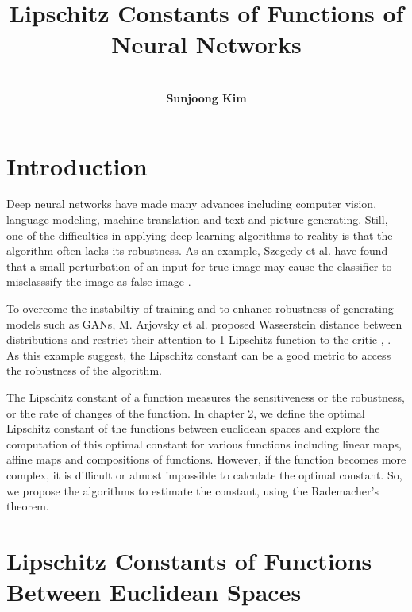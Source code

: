 \documentclass[12pt]{report}
\numberwithin{figure}{chapter}
\theoremstyle{plain}
\theoremstyle{definition}
\theoremstyle{corollary}
\theoremstyle{definition}
\theoremstyle{plain}
\theoremstyle{definition}
\theoremstyle{plain}
\begin{document}
\title{\textbf{Lipschitz Constants of Functions of Neural Networks}}
\author{\\\textbf{Sunjoong Kim}\\}
\setcounter{tocdepth}{1}
\date{}
 \maketitle{}

\tableofcontents

\newpage
\begin{abstract}

\end{abstract}
\newpage
\setcounter{page}{1} \setcounter{section}{0}


\chapter{Introduction}

Deep neural networks have made many advances including computer vision, language modeling, machine translation and text and picture generating.
Still, one of the difficulties in applying deep learning algorithms to reality is that the algorithm often lacks its robustness.
As an example, Szegedy et al. have found that a small perturbation of an input for true image may cause the classifier to misclasssify the image as false image \cite{CS-WZ}.

To overcome the instabiltiy of training and to enhance robustness of generating models such as GANs, M. Arjovsky et al. proposed Wasserstein distance between distributions and restrict their attention to 1-Lipschitz function to the critic \cite{MA-SC}, \cite{GI-AF}.
As this example suggest, the Lipschitz constant can be a good metric to access the robustness of the algorithm.

The Lipschitz constant of a function measures the sensitiveness or the robustness, or the rate of changes of the function.
In chapter 2, we define the optimal Lipschitz constant of the functions between euclidean spaces and explore the computation of this optimal constant for various functions including linear maps, affine maps and compositions of functions.
However, if the function becomes more complex, it is difficult or almost impossible to calculate the optimal constant.
So, we propose the algorithms to estimate the constant, using the Rademacher's theorem.

\chapter{Lipschitz Constants of Functions Between Euclidean Spaces}
\end{document}
